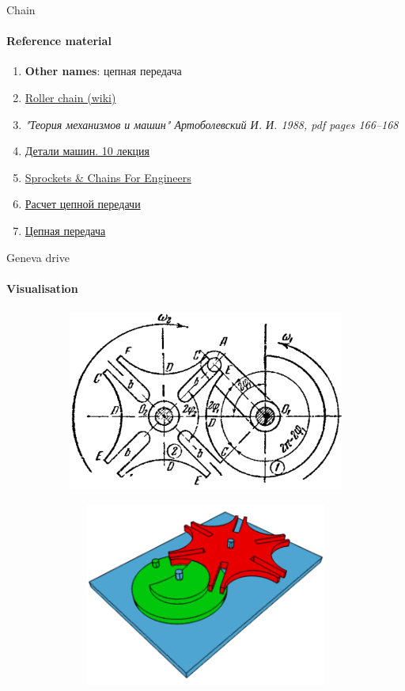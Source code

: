 \documentclass[aspectratio=169]{beamer}
\begin{document}
\begin{frame}[t]{Chain}
    \framesubtitle{Reference material}
    \begin{enumerate}
        \item \textbf{Other names}: цепная передача
        \item \href{https://en.wikipedia.org/wiki/Roller_chain}{Roller chain (wiki)}
        \item \textit{"Теория механизмов и машин" Артоболевский И. И. 1988, pdf pages 166--168 }
        \item \href{https://studfile.net/preview/2156460/}{Детали машин. 10 лекция}
        \item \href{https://www.youtube.com/watch?v=F7o3LOtKEA8}{Sprockets \& Chains For Engineers}
        \item \href{https://studfile.net/preview/4421819/page:3/}{Расчет цепной передачи}
        \item \href{https://youtu.be/ps3yeekVz5I}{Цепная передача}
    \end{enumerate}
\end{frame}

\begin{frame}[t]{Geneva drive}
    \framesubtitle{Visualisation}
    \vspace{-0.5cm}
    \begin{figure}[H]
        \begin{subfigure}{0.49\textwidth}
            \centering\includegraphics[height=6cm,width=1\textwidth,keepaspectratio]{geneva_kinematics.png}
        \end{subfigure}
        \begin{subfigure}{0.49\textwidth}
            \href{https://en.wikipedia.org/wiki/Geneva_drive\#/media/File:Geneva_mechanism_6spoke_animation.gif}{
                \centering\includegraphics[height=6cm,width=1\textwidth,keepaspectratio]{Geneva_drive_video_preview.png}}
        \end{subfigure}
    \end{figure}    
\end{frame}
\end{document}
